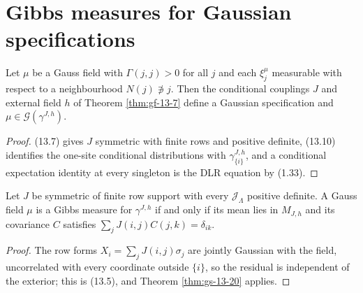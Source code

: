 \section{Gibbs measures for Gaussian specifications}

\begin{theorem}[Georgii (13.20)]
    \label{thm:gs-13-20}
    \leanok

    Let $\mu$ be a Gauss field with $\Gamma(j,j) > 0$ for all $j$ and each $\xi_j^\mu$ measurable
    with respect to a neighbourhood $N(j) \not\ni j$. Then the conditional couplings $J$ and
    external field $h$ of Theorem \ref{thm:gf-13-7} define a Gaussian specification and
    $\mu \in \mathcal G(\gamma^{J,h})$.
\end{theorem}
\begin{proof}
    \leanok
    (13.7) gives $J$ symmetric with finite rows and positive definite, (13.10) identifies the
    one-site conditional distributions with $\gamma^{J,h}_{\{i\}}$, and a conditional expectation
    identity at every singleton is the DLR equation by (1.33).
\end{proof}

\begin{theorem}[Georgii (13.22)]
    \label{thm:gs-13-22}
    \leanok

    Let $J$ be symmetric of finite row support with every $\mathcal J_\Lambda$ positive definite.
    A Gauss field $\mu$ is a Gibbs measure for $\gamma^{J,h}$ if and only if its mean lies in
    $M_{J,h}$ and its covariance $C$ satisfies $\sum_j J(i,j)C(j,k) = \delta_{ik}$.
\end{theorem}
\begin{proof}
    \leanok
    The row forms $X_i = \sum_j J(i,j)\sigma_j$ are jointly Gaussian with the field, uncorrelated
    with every coordinate outside $\{i\}$, so the residual is independent of the exterior; this is
    (13.5), and Theorem \ref{thm:gs-13-20} applies.
\end{proof}

